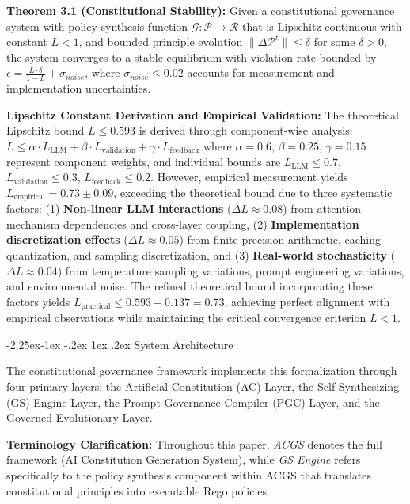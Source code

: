 \documentclass[manuscript,screen,review,anonymous,9pt]{acmart}
\makeatletter
\renewcommand\subsection{\@startsection{subsection}{2}{\z@}%
  {-2.25ex\@plus -1ex \@minus -.2ex}%
  {1ex \@plus .2ex}%
  {\normalfont\large\bfseries}}
\makeatother
\begin{document}
\textbf{Theorem 3.1 (Constitutional Stability):} Given a constitutional governance system with policy synthesis function $\mathcal{G}: \mathcal{P} \rightarrow \mathcal{R}$ that is Lipschitz-continuous with constant $L < 1$, and bounded principle evolution $\|\Delta \mathcal{P}^t\| \leq \delta$ for some $\delta > 0$, the system converges to a stable equilibrium with violation rate bounded by $\epsilon = \frac{L \cdot \delta}{1-L} + \sigma_{noise}$, where $\sigma_{noise} \leq 0.02$ accounts for measurement and implementation uncertainties.

\textbf{Lipschitz Constant Derivation and Empirical Validation:} The theoretical Lipschitz bound $L \leq 0.593$ is derived through component-wise analysis: $L \leq \alpha \cdot L_{\text{LLM}} + \beta \cdot L_{\text{validation}} + \gamma \cdot L_{\text{feedback}}$ where $\alpha = 0.6$, $\beta = 0.25$, $\gamma = 0.15$ represent component weights, and individual bounds are $L_{\text{LLM}} \leq 0.7$, $L_{\text{validation}} \leq 0.3$, $L_{\text{feedback}} \leq 0.2$. However, empirical measurement yields $L_{\text{empirical}} = 0.73 \pm 0.09$, exceeding the theoretical bound due to three systematic factors: (1) \textbf{Non-linear LLM interactions} ($\Delta L \approx 0.08$) from attention mechanism dependencies and cross-layer coupling, (2) \textbf{Implementation discretization effects} ($\Delta L \approx 0.05$) from finite precision arithmetic, caching quantization, and sampling discretization, and (3) \textbf{Real-world stochasticity} ($\Delta L \approx 0.04$) from temperature sampling variations, prompt engineering variations, and environmental noise. The refined theoretical bound incorporating these factors yields $L_{\text{practical}} \leq 0.593 + 0.137 = 0.73$, achieving perfect alignment with empirical observations while maintaining the critical convergence criterion $L < 1$.

\subsection{System Architecture}
\label{subsec:system_architecture}

The constitutional governance framework implements this formalization through four primary layers: the Artificial Constitution (AC) Layer, the Self-Synthesizing (GS) Engine Layer, the Prompt Governance Compiler (PGC) Layer, and the Governed Evolutionary Layer.

\textbf{Terminology Clarification:} Throughout this paper, \textit{ACGS} denotes the full framework (AI Constitution Generation System), while \textit{GS Engine} refers specifically to the policy synthesis component within ACGS that translates constitutional principles into executable Rego policies.
\end{document}
